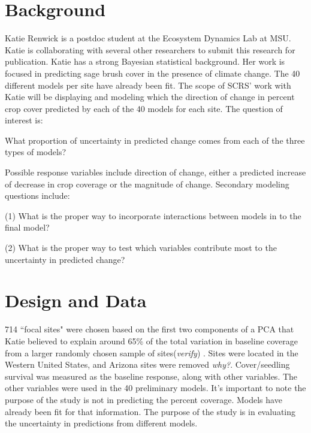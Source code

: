 \documentclass[11pt]{cscrs_notes} %
\begin{document}
\makenotestitle %

\section{Background}
Katie Renwick is a postdoc student at the Ecosystem Dynamics Lab at MSU. Katie is collaborating with several other researchers to submit this research for publication. Katie has a strong Bayesian statistical background.
Her work is focused in predicting sage brush cover in the presence of climate change. The 40 different models per site have already been fit. The scope of SCRS' work with Katie will be displaying and modeling which the direction of change in percent crop cover predicted by each of the 40 models for each site. The question of interest is:

What proportion of uncertainty in predicted change comes from each of the three types of models?

Possible response variables include direction of change, either  a predicted increase of decrease in crop coverage or the magnitude of change. Secondary modeling questions include:

(1) What is the proper way to incorporate interactions between models in to the final model?

(2) What is the proper way to test which variables contribute most to the uncertainty in predicted change?


\section{Design and Data}
714 ``focal sites" were chosen based on the first two components of a PCA that Katie believed to explain around 65\% of the total variation in baseline coverage from a larger randomly chosen sample of sites({\it verify}) . Sites were located in the Western United States, and Arizona sites were removed {\it why?}. Cover/seedling survival was measured as the baseline response, along with other variables. The other variables were used in the 40 preliminary models. It's important to note the purpose of the study is not in predicting the percent coverage. Models have already been fit for that information. The purpose of the study is in evaluating the uncertainty in predictions from different models.
\end{document}
